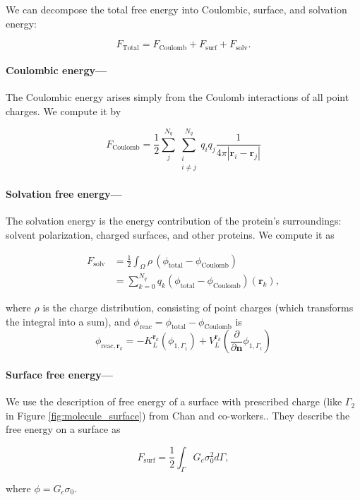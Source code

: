 
We can decompose the total free energy into Coulombic, surface, and solvation energy:

\begin{equation}
F_\text{Total} = F_\text{Coulomb} + F_\text{surf} + F_\text{solv}.
\end{equation}

\medskip

\paragraph*{Coulombic energy---}

The Coulombic energy arises simply from the Coulomb interactions of all point charges. We compute it by

\begin{equation} \label{eq:coul_energy}
F_\text{Coulomb} = \frac{1}{2} \sum_j^{N_q}\sum^{N_q}_{\substack{i\\ i\neq j}} q_iq_j\frac{1}{4\pi |\mathbf{r}_i-\mathbf{r}_j|}
\end{equation}

\paragraph*{Solvation free energy---}

The solvation energy is the energy contribution of the protein's surroundings: solvent polarization, charged surfaces, and other proteins. We compute it as

\begin{align} \label{eq:solv_energy}
F_{\text{solv}} &= \frac{1}{2} \int_{\Omega} \rho \,(\phi_{\text{total}} - \phi_{\text{Coulomb}}) \\
&= \sum_{k=0}^{N_q} q_k (\phi_{\text{total}} - \phi_{\text{Coulomb}})(\mathbf{r}_k),
\end{align}

\noindent where $\rho$ is the charge distribution, consisting of point charges (which transforms the integral into a sum), and $\phi_\text{reac} = \phi_{\text{total}} - \phi_{\text{Coulomb}}$ is
%
\begin{equation} \label{eq:phi_reac_bem}
\phi_{\text{reac},\mathbf{r}_k} = -K_{L}^{\mathbf{r}_k}(\phi_{1,\Gamma_1}) + V_{L}^{\mathbf{r}_k} \left(\frac{\partial}{\partial \mathbf{n}}\phi_{1,\Gamma_1} \right) 
\end{equation}

\paragraph*{Surface free energy---}

We use the description of free energy of a surface with prescribed charge (like $\Gamma_2$ in Figure \ref{fig:molecule_surface}) from Chan and co-workers.\cite{ChanMitchell1983,CarnieChan1993}. They describe the free energy on a surface as

\begin{equation} \label{eq:energy_surf}
F_\text{surf} = \frac{1}{2} \int_{\Gamma} G_c \sigma_0^2 d\Gamma, 
\end{equation} 

\noindent where $\phi = G_c \sigma_0$.
